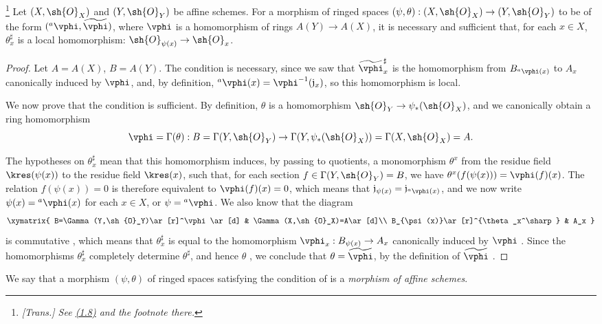 \begin{theorem}[1.7.3]
\label{I.1.7.3}
\footnote{\emph{[Trans.] See \hyperref[subsection:I.1.8]{(1.8)} and the footnote there.}}
Let $(X,\sh{O}_X)$ and $(Y,\sh{O}_Y)$ be affine schemes.
For a morphism of ringed spaces $(\psi,\theta):(X,\sh{O}_X)\to(Y,\sh{O}_Y)$ to be of the form $({}^a\vphi,\widetilde{\vphi})$, where $\vphi$ is a homomorphism of rings $A(Y)\to A(X)$, it is necessary and sufficient that, for each $x\in X$, $\theta_x^\sharp$ is a local homomorphism: $\sh{O}_{\psi(x)}\to\sh{O}_x$.
\end{theorem}

\begin{proof}
Let $A=A(X)$, $B=A(Y)$.
The condition is necessary, since we saw  that $\widetilde{\vphi}_x^\sharp$ is the homomorphism from $B_{{}^a\vphi(x)}$ to $A_x$ canonically induced by $\vphi$, and, by definition, ${}^a\vphi(x)=\vphi^{-1}(\mathfrak{j}_x)$, so this homomorphism is local.

We now prove that the condition is sufficient.
By definition, $\theta$ is a homomorphism $\sh{O}_Y\to\psi_*(\sh{O}_X)$, and we canonically obtain a ring homomorphism
\[
  \vphi=\Gamma(\theta):B=\Gamma(Y,\sh{O}_Y)
  \to\Gamma(Y,\psi_*(\sh{O}_X))=\Gamma(X,\sh{O}_X)=A.
\]

The hypotheses on $\theta_x^\sharp$ mean that this homomorphism induces, by passing to quotients, a monomorphism $\theta^x$ from the residue field $\kres(\psi(x))$ to the residue field $\kres(x)$, such that, for each section $f\in\Gamma(Y,\sh{O}_Y)=B$, we have $\theta^x(f(\psi(x)))=\vphi(f)(x)$.
The relation $f(\psi(x))=0$ is therefore equivalent to $\vphi(f)(x)=0$, which means that $\mathfrak{j}_{\psi(x)}=\mathfrak{j}_{{}^a\vphi(x)}$, and we now write $\psi(x)={}^a\vphi(x)$ for each $x\in X$, or $\psi={}^a\vphi$.
We also know that the diagram
\[
  \xymatrix{
    B=\Gamma(Y,\sh{O}_Y)\ar[r]^\vphi\ar[d] &
    \Gamma(X,\sh{O}_X)=A\ar[d]\\
    B_{\psi(x)}\ar[r]^{\theta_x^\sharp} &
    A_x
  }
\]
is commutative , which means that $\theta_x^\sharp$ is equal to the homomorphism $\vphi_x:B_{\psi(x)}\to A_x$ canonically induced by $\vphi$ .
Since the homomorphisms $\theta_x^\sharp$ completely determine $\theta^\sharp$, and hence $\theta$ , we conclude that $\theta=\widetilde{\vphi}$, by the definition of $\widetilde{\vphi}$ .
\end{proof}

We say that a morphism $(\psi,\theta)$ of ringed spaces satisfying the condition of  is a \emph{morphism of affine schemes}.

